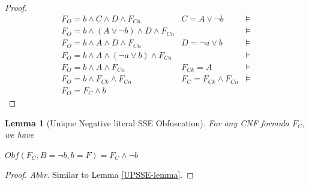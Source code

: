 \documentclass[conference,compsocconf]{IEEEtran}
\newtheorem{lemma}{\textbf{Lemma}}
\begin{document}
\begin{proof}
\begin{equation}
\begin{array}{ccc}
F_O  =  b\wedge C\wedge D\wedge F_{Cn}                  &C=A\vee \neg b~           &\models\\
F_O  =  b\wedge (A\vee \neg b) \wedge D\wedge F_{Cn}    &                          &\models\\
F_O  =  b\wedge A \wedge D\wedge F_{Cn}                 & D=\neg a\vee b~          &\models\\
F_O  =  b\wedge A \wedge (\neg a\vee b)\wedge F_{Cn}    &                          &\models\\
F_O  =  b\wedge A \wedge F_{Cn}                         &F_{Ck} =A                 &\models\\
F_O  =  b\wedge F_{Ck}\wedge F_{Cn}                     & F_C=F_{Ck} \wedge F_{Cn} &\models\\
F_O  =  F_C \wedge b                                    &   &
\end{array}
\end{equation}
\end{proof}

\begin{lemma}[Unique Negative literal SSE Obfuscation]\label{UNSSE-lemma}
For any CNF formula $F_C$, we have

 \textbf{$Obf(F_C,B=\neg b,{b=F})=F_C\wedge \neg b$}
\end{lemma}
\begin{proof}
 \textsl{Abbr.}
  Similar to Lemma \ref{UPSSE-lemma}.
\end{proof}
% 
\end{document}
